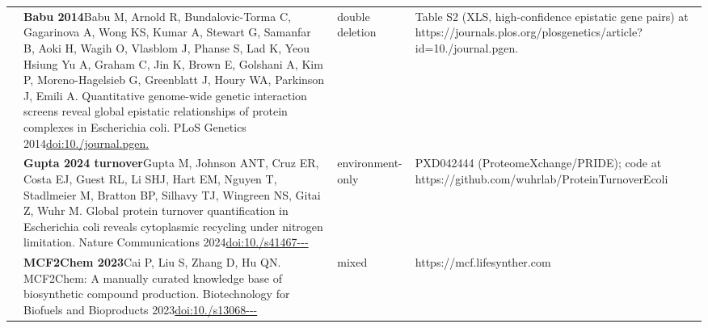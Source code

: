 \begin{landscape}
\begin{longtable}{@{}r@{\hspace{4pt}} L{86mm} L{74mm} L{78mm}@{}}
 & \textbf{Babu 2014}\newline Babu M, Arnold R, Bundalovic-Torma C, Gagarinova A, Wong KS, Kumar A, Stewart G, Samanfar B, Aoki H, Wagih O, Vlasblom J, Phanse S, Lad K, Yeou Hsiung Yu A, Graham C, Jin K, Brown E, Golshani A, Kim P, Moreno-Hagelsieb G, Greenblatt J, Houry WA, Parkinson J, Emili A. Quantitative genome-wide genetic interaction screens reveal global epistatic relationships of protein complexes in Escherichia coli. PLoS Genetics 2014\newline \href{https://doi.org/10.1371/journal.pgen.1004120}{doi:10./\allowbreak journal.\allowbreak pgen.} & double deletion & Table S2 (XLS, high-\allowbreak confidence epistatic gene pairs) at https:/\allowbreak /\allowbreak journals.\allowbreak plos.\allowbreak org/\allowbreak plosgenetics/\allowbreak article?id=10./\allowbreak journal.\allowbreak pgen. \\
 & \textbf{Gupta 2024 turnover}\newline Gupta M, Johnson ANT, Cruz ER, Costa EJ, Guest RL, Li SHJ, Hart EM, Nguyen T, Stadlmeier M, Bratton BP, Silhavy TJ, Wingreen NS, Gitai Z, Wuhr M. Global protein turnover quantification in Escherichia coli reveals cytoplasmic recycling under nitrogen limitation. Nature Communications 2024\newline \href{https://doi.org/10.1038/s41467-024-49920-8}{doi:10./\allowbreak s41467---} & environment-only & PXD042444 (ProteomeXchange/\allowbreak PRIDE); code at https:/\allowbreak /\allowbreak github.\allowbreak com/\allowbreak wuhrlab/\allowbreak ProteinTurnoverEcoli \\
 & \textbf{MCF2Chem 2023}\newline Cai P, Liu S, Zhang D, Hu QN. MCF2Chem: A manually curated knowledge base of biosynthetic compound production. Biotechnology for Biofuels and Bioproducts 2023\newline \href{https://doi.org/10.1186/s13068-023-02419-8}{doi:10./\allowbreak s13068---} & mixed & https:/\allowbreak /\allowbreak mcf.\allowbreak lifesynther.\allowbreak com \\

\end{longtable}
\end{landscape}

